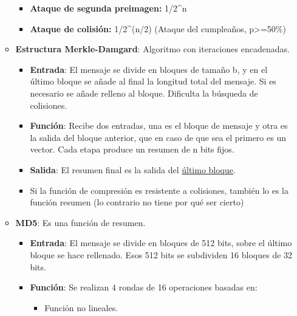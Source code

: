 \documentclass[12pt, twoside, openright]{report} %
\begin{document}
\begin{itemize}
\begin{itemize}
\begin{itemize}
      \item \textbf{Ataque de segunda preimagen:} 1/2\^{}n
        
      \item \textbf{Ataque de colisión:} 1/2\^{}(n/2) (Ataque del
        cumpleaños, p\textgreater=50\%)
        
      \end{itemize}
    \item \textbf{Estructura Merkle-Damgard}: Algoritmo con iteraciones
      encadenadas.
      

      \begin{itemize}
      \item \textbf{Entrada}: El mensaje se divide en bloques de tamaño b, y
        en el último bloque se añade al final la longitud total del
        mensaje. Si es necesario se añade relleno al bloque. Dificulta
        la búsqueda de colisiones.
        
      \item \textbf{Función}: Recibe dos entradas, una es el bloque de
        mensaje y otra es la salida del bloque anterior, que en caso de
        que sea el primero es un vector. Cada etapa produce un resumen
        de n bits fijos.
        
      \item \textbf{Salida}: El resumen final es la salida del
        \underline{último bloque}.
        
      \item Si la función de compresión es resistente a colisiones, también
        lo es la función resumen (lo contrario no tiene por qué ser
        cierto)
        
      \end{itemize}
    \item \textbf{MD5}: Es una función de resumen.
      

      \begin{itemize}
      \item \textbf{Entrada}: El mensaje se divide en bloques de 512 bits,
        sobre el último bloque se hace rellenado. Esos 512 bits se
        subdividen 16 bloques de 32 bits.
        
      \item \textbf{Función}: Se realizan 4 rondas de 16 operaciones basadas
        en:
        

        \begin{itemize}
        \item Función no lineales.
          

\end{itemize}
\end{itemize}
\end{itemize}
\end{itemize}
\end{document}
